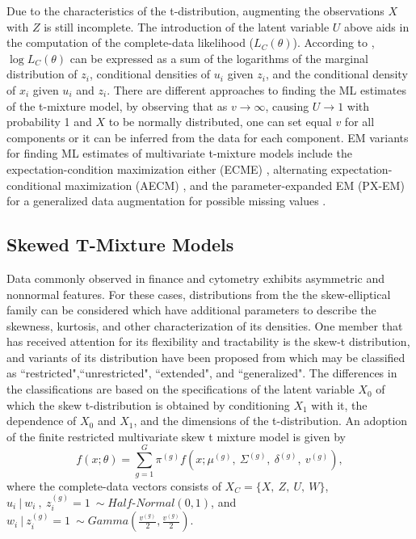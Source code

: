 Due to the characteristics of the t-distribution, augmenting the observations $\displaystyle X$ with $\displaystyle Z$ is still incomplete. The introduction of the latent variable $\displaystyle U$ above aids in the computation of the complete-data likelihood ($\displaystyle L_{C}( \theta )$). According to , $\displaystyle \log L_{C}( \theta )$ can be expressed as a sum of the logarithms of the marginal distribution of $\displaystyle z_{i}$, conditional densities of $\displaystyle u_{i}$ given $\displaystyle z_{i}$, and the conditional density of $\displaystyle x_{i}$ given $\displaystyle u_{i}$ and $\displaystyle z_{i}$. There are different approaches to finding the ML estimates of the t-mixture model, by observing that as $\displaystyle v\rightarrow \infty $, causing $\displaystyle U\rightarrow 1$ with probability 1 and $\displaystyle X$ to be normally distributed, one can set equal $\displaystyle v$ for all components or it can be inferred from the data for each component. EM variants for finding ML estimates of multivariate t-mixture models include the expectation-condition maximization either (ECME) \cite{Liu2002}, alternating expectation-conditional maximization (AECM) \cite{Meng1997}, and the parameter-expanded EM (PX-EM) for a generalized data augmentation for possible missing values \cite{Liu2002}.

\subsection{Skewed T-Mixture Models}
\label{sec:skewedtmix_ch3}
Data commonly observed in finance and cytometry exhibits asymmetric and nonnormal features. For these cases, distributions from the the skew-elliptical family can be considered which have additional parameters to describe the skewness, kurtosis, and other characterization of its densities.  One member that has received attention for its flexibility and tractability is the skew-t distribution, and variants of its distribution have been proposed from  which may be classified as ``restricted",``unrestricted", ``extended", and ``generalized". The differences in the classifications are based on the specifications of the latent variable $X_0$ of which the skew t-distribution is obtained by conditioning $X_1$ with it, the dependence of $X_0$ and $X_1$, and the dimensions of the t-distribution. An adoption of the finite restricted multivariate skew t mixture model is given by
\begin{equation*}
    f( x;\theta ) =\sum\limits ^{G}_{g=1} \pi ^{( g)} f\left( x;\mu ^{( g)} ,\ \Sigma ^{( g)} ,\ \delta ^{( g)} ,\ v^{( g)}\right),
\end{equation*}
where the complete-data vectors consists of $\displaystyle X_{C} =\{X,\ Z,\ U,\ W\}$, $\displaystyle u_{i} \ |\ w_{i} \ ,\ z^{( g)}_{i} =1\ \sim Half\text{-} Normal( 0,1)$, and $\displaystyle w_{i} \ |\ z^{( g)}_{i} =1\ \sim Gamma\left(\frac{v^{( g)}}{2} ,\frac{v^{( g)}}{2}\right)$. 

